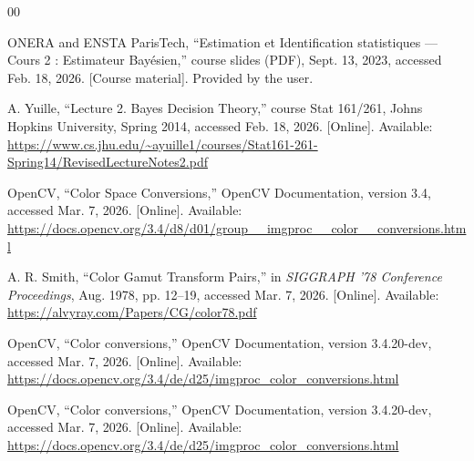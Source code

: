 \documentclass[conference]{IEEEtran}
\begin{document}


\begin{thebibliography}{00}
    
ONERA and ENSTA ParisTech, ``Estimation et Identification statistiques --- Cours 2 : Estimateur Bayésien,'' course slides (PDF), Sept. 13, 2023, accessed Feb. 18, 2026. [Course material]. Provided by the user.

A. Yuille, ``Lecture 2. Bayes Decision Theory,'' course Stat 161/261, Johns Hopkins University, Spring 2014, accessed Feb. 18, 2026. [Online]. Available: \url{https://www.cs.jhu.edu/~ayuille1/courses/Stat161-261-Spring14/RevisedLectureNotes2.pdf}

OpenCV, ``Color Space Conversions,'' OpenCV Documentation, version 3.4, accessed Mar. 7, 2026. [Online]. Available: \url{https://docs.opencv.org/3.4/d8/d01/group__imgproc__color__conversions.html}

A. R. Smith, ``Color Gamut Transform Pairs,'' in \textit{SIGGRAPH '78 Conference Proceedings}, Aug. 1978, pp. 12--19, accessed Mar. 7, 2026. [Online]. Available: \url{https://alvyray.com/Papers/CG/color78.pdf}

OpenCV, ``Color conversions,'' OpenCV Documentation, version 3.4.20-dev, accessed Mar. 7, 2026. [Online]. Available: \url{https://docs.opencv.org/3.4/de/d25/imgproc_color_conversions.html}

OpenCV, ``Color conversions,'' OpenCV Documentation, version 3.4.20-dev, accessed Mar. 7, 2026. [Online]. Available: \url{https://docs.opencv.org/3.4/de/d25/imgproc_color_conversions.html}
\end{thebibliography}
\end{document}
